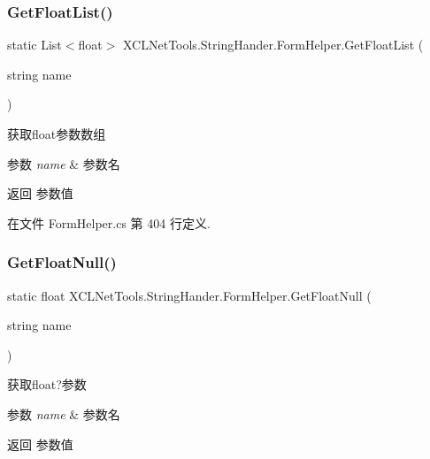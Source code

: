 \subsubsection{\texorpdfstring{Get\+Float\+List()}{GetFloatList()}}
{\footnotesize\ttfamily static List$<$float$>$ X\+C\+L\+Net\+Tools.\+String\+Hander.\+Form\+Helper.\+Get\+Float\+List (\begin{DoxyParamCaption}\item[{string}]{name }\end{DoxyParamCaption})\hspace{0.3cm}{\ttfamily [static]}}



获取float参数数组 


\begin{DoxyParams}{参数}
{\em name} & 参数名\\
\hline
\end{DoxyParams}
\begin{DoxyReturn}{返回}
参数值
\end{DoxyReturn}


在文件 Form\+Helper.\+cs 第 404 行定义.

\mbox{\label{class_x_c_l_net_tools_1_1_string_hander_1_1_form_helper_a6d0d3c455a9582ca4a4fa5bf4269deff}} 
\subsubsection{\texorpdfstring{Get\+Float\+Null()}{GetFloatNull()}\hspace{0.1cm}{\footnotesize\ttfamily [1/2]}}
{\footnotesize\ttfamily static float X\+C\+L\+Net\+Tools.\+String\+Hander.\+Form\+Helper.\+Get\+Float\+Null (\begin{DoxyParamCaption}\item[{string}]{name }\end{DoxyParamCaption})\hspace{0.3cm}{\ttfamily [static]}}



获取float?参数 


\begin{DoxyParams}{参数}
{\em name} & 参数名\\
\hline
\end{DoxyParams}
\begin{DoxyReturn}{返回}
参数值
\end{DoxyReturn}


